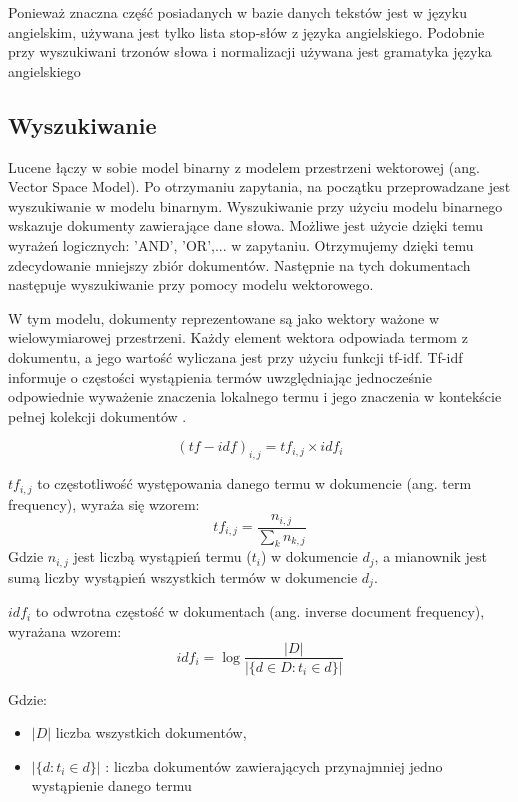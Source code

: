 Ponieważ znaczna część posiadanych w bazie danych tekstów jest w języku angielskim, używana jest tylko lista stop-słów z języka angielskiego. Podobnie przy wyszukiwani trzonów słowa i normalizacji używana jest gramatyka języka angielskiego

\subsection*{Wyszukiwanie}

Lucene łączy w sobie model binarny z modelem przestrzeni wektorowej (ang. Vector Space Model). Po otrzymaniu zapytania, na początku przeprowadzane jest wyszukiwanie w modelu binarnym. Wyszukiwanie przy użyciu modelu binarnego wskazuje dokumenty zawierające dane słowa. Możliwe jest użycie dzięki temu wyrażeń logicznych: 'AND', 'OR',... w zapytaniu. Otrzymujemy dzięki temu zdecydowanie mniejszy zbiór dokumentów. Następnie na tych dokumentach następuje wyszukiwanie przy pomocy modelu wektorowego. 

W tym modelu, dokumenty reprezentowane są jako wektory ważone w wielowymiarowej przestrzeni. Każdy element wektora odpowiada termom z dokumentu, a jego wartość wyliczana jest przy użyciu funkcji tf-idf. Tf-idf informuje o częstości wystąpienia termów uwzględniając jednocześnie odpowiednie wyważenie znaczenia lokalnego termu i jego znaczenia w kontekście pełnej kolekcji dokumentów \cite{wikipedia:tf_idf}.

\begin{equation}
(tf-idf)_{i,j} = tf_{i, j} \times idf_i
\end{equation}

$tf_{i, j}$ to częstotliwość występowania  danego termu w dokumencie (ang. term frequency), wyraża się wzorem:
\begin{equation}
tf_{i, j} = \frac{n_{i,j}}{\sum_k n_{k,j}}
\end{equation}
Gdzie $n_{i,j}$ jest liczbą wystąpień termu ($t_{i}$) w dokumencie $d_{j}$, a mianownik jest sumą liczby wystąpień wszystkich termów w dokumencie $d_{j}$.

$idf_i$ to odwrotna częstość w dokumentach (ang. inverse document frequency), wyrażana wzorem:
\begin{equation}
idf_i= \log \frac{|D|}{|\{d \in D : t_i \in d\}|}
\end{equation}


Gdzie:
\begin{itemize}
\item $|D|$ liczba wszystkich dokumentów,
\item $|\{d : t_{i} \in d\}|$  : liczba dokumentów zawierających przynajmniej jedno wystąpienie danego termu
\end{itemize}


